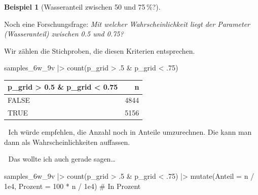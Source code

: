 \documentclass[
  ngerman,
  letterpaper,
  twoside,
  open=any]{scrbook}
\newenvironment{Shaded}{\begin{snugshade}}{\end{snugshade}}
\newcommand{\AttributeTok}[1]{\textcolor[rgb]{0.40,0.45,0.13}{#1}}
\newcommand{\CommentTok}[1]{\textcolor[rgb]{0.37,0.37,0.37}{#1}}
\newcommand{\DecValTok}[1]{\textcolor[rgb]{0.68,0.00,0.00}{#1}}
\newcommand{\FloatTok}[1]{\textcolor[rgb]{0.68,0.00,0.00}{#1}}
\newcommand{\FunctionTok}[1]{\textcolor[rgb]{0.28,0.35,0.67}{#1}}
\newcommand{\NormalTok}[1]{\textcolor[rgb]{0.00,0.23,0.31}{#1}}
\newcommand{\SpecialCharTok}[1]{\textcolor[rgb]{0.37,0.37,0.37}{#1}}
\newcounter{none} %
\theoremstyle{definition}
\newtheorem{example}{Beispiel}[chapter]
\theoremstyle{plain}
\theoremstyle{definition}
\theoremstyle{definition}
\theoremstyle{definition}
\newtheorem{example}{Beispiel}[chapter]
\theoremstyle{definition}
\theoremstyle{remark}
\begin{document}
\begin{example}[Wasseranteil zwischen 50 und
75\,\%?]\protect\hypertarget{exm-param2}{}\label{exm-param2}

Noch eine Forschungsfrage: \emph{Mit welcher Wahrscheinlichkeit liegt
der Parameter (Wasseranteil) zwischen 0.5 und 0.75?}

Wir zählen die Stichproben, die diesen Kriterien entsprechen.

\begin{Shaded}
\begin{Highlighting}[]
\NormalTok{samples\_6w\_9v }\SpecialCharTok{|\textgreater{}} 
  \FunctionTok{count}\NormalTok{(p\_grid }\SpecialCharTok{\textgreater{}}\NormalTok{ .}\DecValTok{5} \SpecialCharTok{\&}\NormalTok{ p\_grid }\SpecialCharTok{\textless{}}\NormalTok{ .}\DecValTok{75}\NormalTok{)}
\end{Highlighting}
\end{Shaded}

{\def\LTcaptype{none} %
\begin{longtable}[]{@{}lr@{}}
\toprule\noalign{}
p\_grid \textgreater{} 0.5 \& p\_grid \textless{} 0.75 & n \\
\midrule\noalign{}
\endhead
\bottomrule\noalign{}
\endlastfoot
FALSE & 4844 \\
TRUE & 5156 \\
\end{longtable}
}

\begin{displayquote}
🤖 Ich würde empfehlen, die Anzahl noch in Anteile umzurechnen. Die kann
man dann als Wahrscheinlichkeiten auffassen.
\end{displayquote}

\begin{displayquote}
👨 Das wollte ich auch gerade sagen\ldots{}
\end{displayquote}

\begin{Shaded}
\begin{Highlighting}[]
\NormalTok{samples\_6w\_9v }\SpecialCharTok{|\textgreater{}}
  \FunctionTok{count}\NormalTok{(p\_grid }\SpecialCharTok{\textgreater{}}\NormalTok{ .}\DecValTok{5} \SpecialCharTok{\&}\NormalTok{ p\_grid }\SpecialCharTok{\textless{}}\NormalTok{ .}\DecValTok{75}\NormalTok{) }\SpecialCharTok{|\textgreater{}}
  \FunctionTok{mutate}\NormalTok{(}\AttributeTok{Anteil =}\NormalTok{ n }\SpecialCharTok{/} \FloatTok{1e4}\NormalTok{,}
         \AttributeTok{Prozent =} \DecValTok{100} \SpecialCharTok{*}\NormalTok{ n }\SpecialCharTok{/} \FloatTok{1e4}\NormalTok{)  }\CommentTok{\# In Prozent}
\end{Highlighting}
\end{Shaded}


\end{example}
\end{document}
